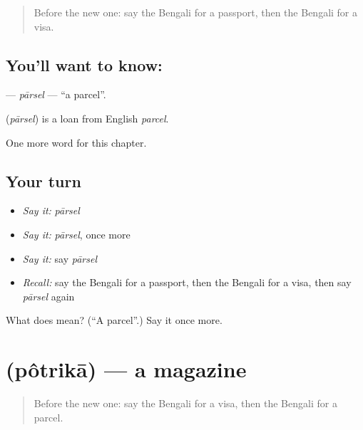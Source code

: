 \label{lesson:BN-C248-parsel}



\begin{quote}
Before the new one: say the Bengali for a passport, then the Bengali for a visa.
\end{quote}

\subsection*{You'll want to know: }
\textbf{} — \emph{pārsel} — \textquotedblleft{}a parcel\textquotedblright{}.

\begin{cousinweb}
\textbf{} (\emph{pārsel}) is a loan from English \emph{parcel}.
\end{cousinweb}

\begin{grammarlens}[title={What you've built}]
One more word for this chapter.
\end{grammarlens}

\subsection*{Your turn}
\begin{itemize}
\raggedright
  \item \emph{Say it:} \emph{pārsel}
  \item \emph{Say it:} \emph{pārsel}, once more
  \item \emph{Say it:} say \emph{pārsel}
  \item \emph{Recall:} say the Bengali for a passport, then the Bengali for a visa, then say \emph{pārsel} again
\end{itemize}

\begin{tcolorbox}[breakable,colback=teal!4,colframe=teal!35!black,title={Before you move on}]
What does  mean? (\textquotedblleft{}A parcel\textquotedblright{}.) Say it once more.
\end{tcolorbox}
\section[\texorpdfstring{\bn{পত্রিকা} (pôtrikā)}{পত্রিকা (pôtrikā)}]{ (pôtrikā) — a magazine}

\label{lesson:BN-C248-potrika}



\begin{quote}
Before the new one: say the Bengali for a visa, then the Bengali for a parcel.
\end{quote}

